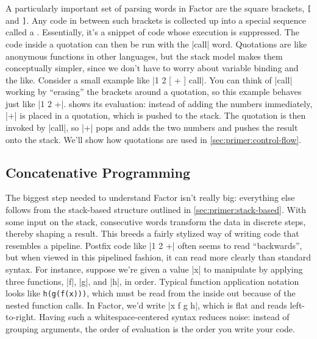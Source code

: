 


A particularly important set of parsing words in Factor are the square
brackets, \Verb|[| and \Verb|]|.  Any code in between such brackets is
collected up into a special sequence called a .  Essentially,
it's a snippet of code whose execution is suppressed.  The code inside a
quotation can then be run with the \factor|call| word.  Quotations are like
anonymous functions in other languages, but the stack model makes them
conceptually simpler, since we don't have to worry about variable binding and
the like.  Consider a small example like \factor|1 2 [ + ] call|.  You can
think of \factor|call| working by ``erasing'' the brackets around a quotation,
so this example behaves just like \factor|1 2 +|.   shows its
evaluation: instead of adding the numbers immediately, \factor|+| is placed in
a quotation, which is pushed to the stack.  The quotation is then invoked by
\factor|call|, so \factor|+| pops and adds the two numbers and pushes the
result onto the stack.  We'll show how quotations are used in
\cref{sec:primer:control-flow}.


\subsection{Concatenative Programming}

The biggest step needed to understand Factor isn't really big: everything else
follows from the stack-based structure outlined in
\cref{sec:primer:stack-based}.  With some input on the stack, consecutive words
transform the data in discrete steps, thereby shaping a result.  This breeds a
fairly stylized way of writing code that resembles a pipeline.  Postfix code
like \factor|1 2 +| often seems to read ``backwards'', but when viewed in
this pipelined fashion, it can read more clearly than standard syntax.  For
instance, suppose we're given a value \factor|x| to manipulate by applying
three functions, \factor|f|, \factor|g|, and \factor|h|, in order.
Typical function application notation looks like \texttt{h(g(f(x)))}, which
must be read from the inside out because of the nested function calls.  In
Factor, we'd write \factor|x f g h|, which is flat and reads left-to-right.
Having such a whitespace-centered syntax reduces noise: instead of grouping
arguments, the order of evaluation is the order you write your code.

